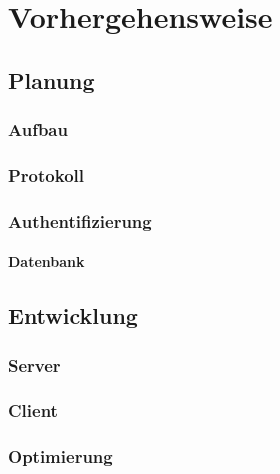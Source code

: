 \chapter{Vorhergehensweise}\label{ch:umsetzung}
    \section{Planung}
    \subsection{Aufbau}

    \subsection{Protokoll}

    \subsection{Authentifizierung}

    \subsubsection{Datenbank}

    \section{Entwicklung}
    \subsection{Server}
    \subsection{Client}
    \subsection{Optimierung}
